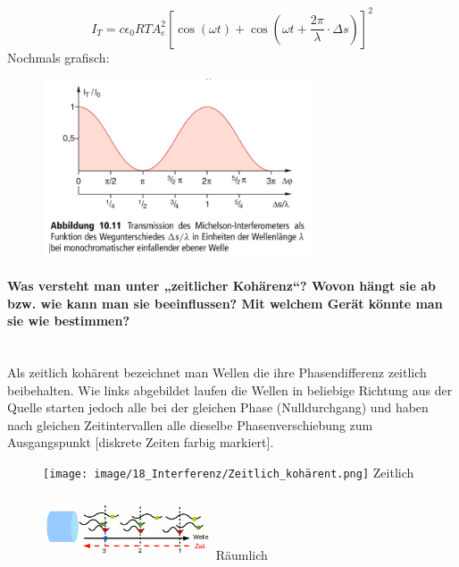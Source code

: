 \documentclass[a4paper, 11pt, ngerman, parskip=half-]{scrartcl}
\newcommand{\myparagraph}[1]{\paragraph{#1}\mbox{}\\}
\begin{document}
\begin{equation}
    I_T = c \epsilon_0 RT A_e^2[\cos(\omega t) + \cos(\omega t + \frac{2\pi}{\lambda}\cdot \Delta s)]^2
\end{equation}
Nochmals grafisch:
\begin{figure}[H]
    \centering
    \includegraphics[width=8cm]{image/18_Interferenz/Michelson_Funktion_Wegunterschied.png}
\end{figure}

\myparagraph{Was versteht man unter „zeitlicher Kohärenz“? Wovon hängt sie ab bzw. wie kann man sie
beeinflussen? Mit welchem Gerät könnte man sie wie bestimmen?}

Als \glqq zeitlich kohärent \grqq bezeichnet man Wellen die ihre Phasendifferenz zeitlich beibehalten. Wie links abgebildet laufen die Wellen in beliebige Richtung aus der Quelle
starten jedoch alle bei der gleichen Phase (Nulldurchgang) und haben nach gleichen Zeitintervallen alle dieselbe Phasenverschiebung zum Ausgangspunkt [diskrete Zeiten farbig markiert].
\begin{figure}[H]
    \centering
    \begin{minipage}[b]{0.3\textwidth}
        \centering
        \texttt{[image: image/18\_Interferenz/Zeitlich\_kohärent.png]}
        Zeitlich
    \end{minipage}
    \hspace{2cm}
    \begin{minipage}[b]{0.3\textwidth}
        \centering
        \includegraphics[width=5cm]{image/18_Interferenz/räumliche_kohärenz.png}
        Räumlich
    \end{minipage}
\end{figure}
\end{document}

